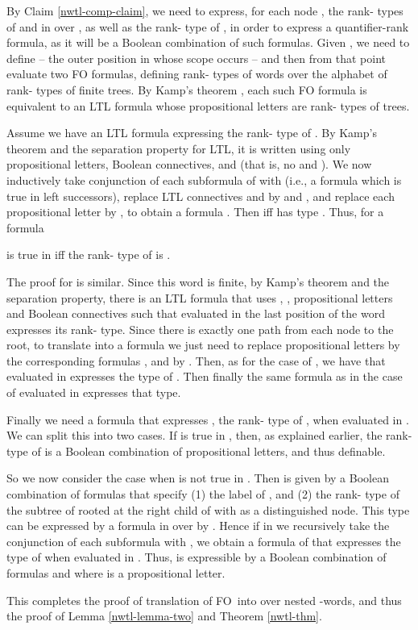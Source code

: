 \documentclass{LMCS}
\newcommand{\FO}{{\rm FO}}
\theoremstyle{plain}
\theoremstyle{definition}
\begin{document}
{By Claim \ref{nwtl-comp-claim}, we need to express, for each node ,
the rank- types of  and  in
 over , as well as the rank- type of ,
in order to express a quantifier-rank  formula, as it will be a
Boolean combination of such formulas. Given , we need to define
 -- the outer position in whose scope  occurs -- and then
from that point evaluate two FO formulas, defining rank- types of
words over the alphabet of rank- types of finite trees. By Kamp's
theorem \cite{Kamp}, each such FO formula is equivalent to an LTL formula whose
propositional letters are rank- types of trees.

Assume we have an LTL formula  expressing the rank- type
 of . By Kamp's theorem and the separation
property for LTL, it is written using only propositional letters,
Boolean connectives,  and  (that is, no  and
). We now inductively take conjunction of each subformula of
 with  (i.e., a  formula which is true
in left successors), replace LTL connectives  and  by 
and , and replace each propositional letter  by
, to obtain a  formula . Then
 iff  has type
. Thus, for a formula 

is true in  iff the rank- type of 
is . 

The proof for  is similar. Since this word is finite,
by Kamp's theorem and the separation property, there is an LTL formula
 that uses , , propositional letters and Boolean
connectives such that  evaluated in the last position of the
word expresses its rank- type. Since there is exactly one path from
each node to the root, to translate  into a  formula
 we just need to replace propositional letters by the corresponding
formulas , and  by . Then, as for the case 
of , we have that  evaluated in 
expresses the type of . Then finally the same formula
as in the case of  evaluated in  expresses that
type.

Finally we need a  formula that expresses , the
rank- type of , when evaluated in . 
We can split this into two cases. If  is 
true in , then, as explained earlier,
the rank- type of  is a Boolean combination of
propositional 
letters, and thus definable. 

 So we now consider the case when  is 
not true in . Then  
is given by a Boolean combination of formulas that specify (1)
the label of , and (2) the rank- type of the subtree of
 rooted at the right child of  with  as a 
distinguished node. This type can be expressed by a formula 
in  over  by \cite{marx-pods04}. Hence if in
 we recursively take the conjunction of each subformula with
, we obtain a formula  of  that
expresses the type of  when evaluated in
. Thus,  is expressible by a Boolean combination
of formulas  and  where  is a propositional letter.

This completes the proof of translation of \FO\ into  over
nested -words, and thus the proof of Lemma
\ref{nwtl-lemma-two} and 
Theorem \ref{nwtl-thm}.}
\end{document}

